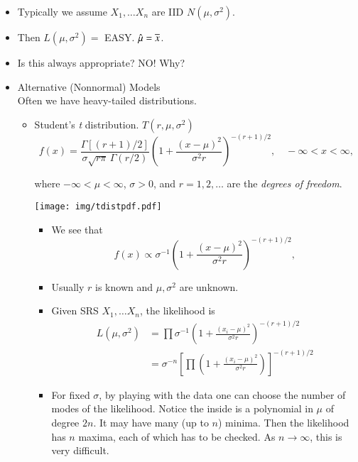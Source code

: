 \documentclass[captions=tableheading]{scrbook}
\begin{document}
\begin{itemize}
\item Typically we assume \(X_{1},\ldots X_{n}\) are IID \(N(\mu,\sigma^{2})\).
\item Then \( L(\mu,\sigma^{2}) = \) EASY.  \(\hat{\mu} = \overline{x}\).
\item Is this always appropriate?  NO!  Why?
\end{itemize}
\begin{itemize}

\item Alternative (Nonnormal) Models\\
\label{sec-1_2_2_1}%
Often we have heavy-tailed distributions.


\begin{itemize}
\item Student's \emph{t} distribution.  $T(r,\mu,\sigma^2)$
    \begin{equation}
    f(x)=\frac{\Gamma\left[(r+1)/2\right]}{\sigma\sqrt{r\pi}\,\Gamma(r/2)}\left(1+\frac{(x - \mu)^{2}}{\sigma^{2}r}\right)^{-(r+1)/2},\quad-\infty<x<\infty,
    \end{equation}

    where $-\infty < \mu < \infty$, $\sigma > 0$, and $r = 1, 2,\ldots$ are the \emph{degrees of freedom}.
    \begin{center}

    \texttt{[image: img/tdistpdf.pdf]}

    \end{center}
\begin{itemize}
\item We see that 
    \begin{equation}
    f(x) \propto \sigma^{-1}\left(1+\frac{(x - \mu)^{2}}{\sigma^{2}r}\right)^{-(r+1)/2},
    \end{equation}
\item Usually $r$ is known and $\mu,\sigma^{2}$ are unknown.
\item Given SRS  \(X_{1},\ldots X_{n}\), the likelihood is
    \begin{align*}
    L(\mu,\sigma^{2}) & = \prod \sigma^{-1}\left(1+\frac{(x_{i} - \mu)^{2}}{\sigma^{2}r}\right)^{-(r+1)/2}\\
    & =  \sigma^{-n} \left[\prod \left(1+\frac{(x_{i} - \mu)^{2}}{\sigma^{2}r}\right) \right]^{-(r+1)/2}
    \end{align*}
\item For fixed $\sigma$, by playing with the data one can choose the number of modes of the likelihood.  Notice the inside is a polynomial in $\mu$ of degree $2n$.  It may have many (up to $n$) minima.  Then the likelihood has $n$ maxima, each of which has to be checked.  As $n \to \infty$, this is very difficult.
\end{itemize}
\end{itemize}


\end{itemize}
\end{document}
